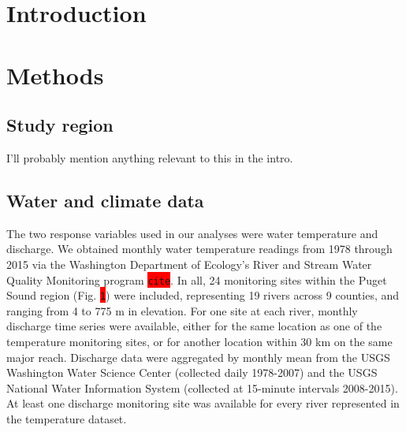 \documentclass{article}
\begin{document}

\section*{Introduction}

\section*{Methods}

\subsection*{Study region}

I'll probably mention anything relevant to this in the intro.

\subsection*{Water and climate data}

The two response variables used in our analyses were water temperature and discharge. We obtained monthly water temperature readings from 1978 through 2015 via the Washington Department of Ecology's River and Stream Water Quality Monitoring program \colorbox{red}{\lstinline{cite}}. In all, 24 monitoring sites within the Puget Sound region (Fig. \colorbox{red}{\lstinline{1}}) were included, representing 19 rivers across 9 counties, and ranging from 4 to 775 m in elevation. For one site at each river, monthly discharge time series were available, either for the same location as one of the temperature monitoring sites, or for another location within 30 km on the same major reach. Discharge data were aggregated by monthly mean from the USGS Washington Water Science Center (collected daily 1978-2007) and the USGS National Water Information System (collected at 15-minute intervals 2008-2015). At least one discharge monitoring site was available for every river represented in the temperature dataset.
\end{document}
